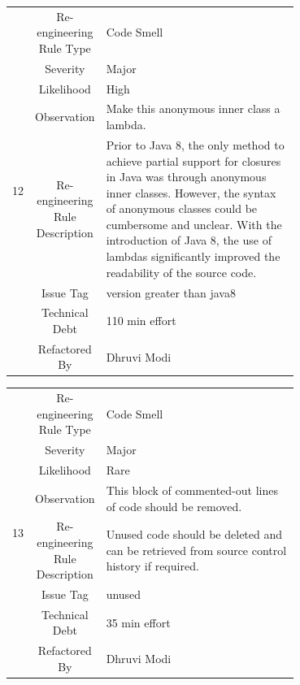 \documentclass[12pt,letterpaper]{report}
\begin{document}
{\begin{table}
    \begin{tabular}{|c|c|p{0.7\linewidth}|}
    \hline   
    \multirow{8}{*}{12}
        & Re-engineering Rule Type & Code Smell \\
    \cline{2-3}
       & Severity &  Major \\
    \cline{2-3}
       & Likelihood &  High \\
    \cline{2-3}
       & Observation & Make this anonymous inner class a lambda. \\
    \cline{2-3}
       & Re-engineering Rule Description & Prior to Java 8, the only method to achieve partial support for closures in Java was through anonymous inner classes. However, the syntax of anonymous classes could be cumbersome and unclear. With the introduction of Java 8, the use of lambdas significantly improved the readability of the source code.  \\
    \cline{2-3}
       & Issue Tag & version greater than java8\\
    \cline{2-3}
       & Technical Debt & 110 min effort  \\
    \cline{2-3}
       & Refactored By & Dhruvi Modi \\
    \hline
    \end{tabular}
\end{table}

\begin{table}
    \begin{tabular}{|c|c|p{0.7\linewidth}|}
    \hline   
    \multirow{8}{*}{13}
        & Re-engineering Rule Type & Code Smell \\
    \cline{2-3}
       & Severity &  Major \\
    \cline{2-3}
       & Likelihood &  Rare\\
    \cline{2-3}
       & Observation & This block of commented-out lines of code should be removed. \\
    \cline{2-3}
       & Re-engineering Rule Description &  Unused code should be deleted and can be retrieved from source control history if required. \\
    \cline{2-3}
       & Issue Tag & unused\\
    \cline{2-3}
       & Technical Debt & 35 min effort  \\
    \cline{2-3}
       & Refactored By & Dhruvi Modi \\
    \hline
    \end{tabular}
\end{table}

}
\end{document}
